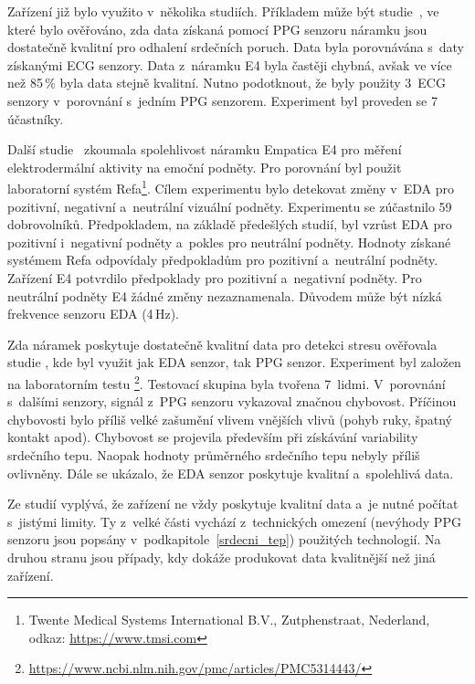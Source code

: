         
        Zařízení již bylo využito v~několika studiích. Příkladem může být studie~\cite{e4_validation}, ve které bylo ověřováno, zda data získaná pomocí PPG senzoru náramku jsou dostatečně kvalitní pro odhalení srdečních poruch. Data byla porovnávána s~daty získanými ECG senzory. Data z~náramku E4 byla častěji chybná, avšak ve více než 85\,\% byla data stejně kvalitní. Nutno podotknout, že byly použity 3~ECG senzory v~porovnání s~jedním PPG senzorem. Experiment byl proveden se 7 účastníky.
        
        Další studie~\cite{e4_reliability} zkoumala spolehlivost náramku Empatica E4 pro měření elektrodermální aktivity na emoční podněty. Pro porovnání byl použit laboratorní systém Refa\footnote{Twente Medical Systems International B.V., Zutphenstraat, Nederland, odkaz: \url{https://www.tmsi.com}}. Cílem experimentu bylo detekovat změny v~EDA pro pozitivní, negativní a~neutrální vizuální podněty. Experimentu se zúčastnilo 59 dobrovolníků. Předpokladem, na základě předešlých studií, byl vzrůst EDA pro pozitivní i~negativní podněty a~pokles pro neutrální podněty. Hodnoty získané systémem Refa odpovídaly předpokladům pro pozitivní a~neutrální podněty. Zařízení E4 potvrdilo předpoklady pro pozitivní a~negativní podněty. Pro neutrální podněty E4 žádné změny nezaznamenala. Důvodem může být nízká frekvence senzoru EDA (4\,Hz).
        
        Zda náramek poskytuje dostatečně kvalitní data pro detekci stresu ověřovala studie \cite{e4_stress_detection}, kde byl využit jak EDA senzor, tak PPG senzor. Experiment byl založen na laboratorním testu \footnote{\url{https://www.ncbi.nlm.nih.gov/pmc/articles/PMC5314443/}}. Testovací skupina byla tvořena 7~lidmi. V~porovnání s~dalšími senzory, signál z~PPG senzoru vykazoval značnou chybovost. Příčinou chybovosti bylo příliš velké zašumění vlivem vnějších vlivů (pohyb ruky, špatný kontakt apod). Chybovost se projevila především při získávání variability srdečního tepu. Naopak hodnoty průměrného srdečního tepu nebyly příliš ovlivněny. Dále se ukázalo, že EDA senzor poskytuje kvalitní a~spolehlivá data.
        
        \vspace{3mm}
        
        Ze studií vyplývá, že zařízení ne vždy poskytuje kvalitní data a~je nutné počítat s~jistými limity. Ty z~velké části vychází z~technických omezení (nevýhody PPG senzoru jsou popsány v~podkapitole~\ref{srdecni_tep}) použitých technologií. Na druhou stranu jsou případy, kdy dokáže produkovat data kvalitnější než jiná zařízení.
        
